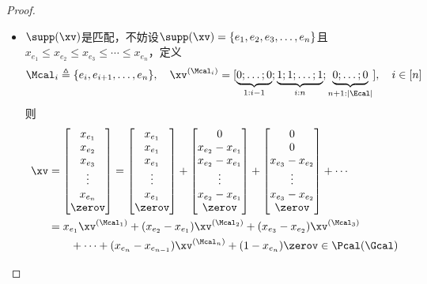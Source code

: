 \documentclass{ctexart}
\begin{document}
\begin{proof}
\begin{itemize}
        \item $\supp(\xv)$是匹配，不妨设$\supp(\xv) = \{ e_1, e_2, e_3, \ldots, e_n \}$且$x_{e_1} \le x_{e_2} \le x_{e_3} \le \cdots \le x_{e_n}$，定义
              \begin{align*}
                  \Mcal_i \triangleq \{ e_i, e_{i+1}, \ldots, e_n \}, \quad \xv^{(\Mcal_i)} = [\underbrace{0; \ldots; 0}_{1:i-1}; \underbrace{1; 1; \ldots; 1}_{i:n}; \underbrace{0; \ldots; 0}_{n+1:|\Ecal|}], \quad i \in [n]
              \end{align*}
              则
              \begin{align*}
                  \xv & = \begin{bmatrix} x_{e_1} \\ x_{e_2} \\ x_{e_3} \\ \vdots \\ x_{e_n} \\ \zerov \end{bmatrix} = \begin{bmatrix} x_{e_1} \\ x_{e_1} \\ x_{e_1} \\ \vdots \\ x_{e_1} \\ \zerov \end{bmatrix} + \begin{bmatrix} 0 \\ x_{e_2} - x_{e_1} \\ x_{e_2} - x_{e_1} \\ \vdots \\ x_{e_2} - x_{e_1} \\ \zerov \end{bmatrix} + \begin{bmatrix} 0 \\ 0 \\ x_{e_3} - x_{e_2} \\ \vdots \\ x_{e_3} - x_{e_2} \\ \zerov \end{bmatrix} + \cdots \\
                      & = x_{e_1} \xv^{(\Mcal_1)} + (x_{e_2} - x_{e_1}) \xv^{(\Mcal_2)} + (x_{e_3} - x_{e_2}) \xv^{(\Mcal_3)}                                                                                                                                                                                                                                                                                                                        \\
                      & \qquad + \cdots + (x_{e_n} - x_{e_{n-1}}) \xv^{(\Mcal_n)} + (1 - x_{e_n}) \zerov \in \Pcal (\Gcal)
              \end{align*}
    \end{itemize}
\end{proof}
\end{document}
